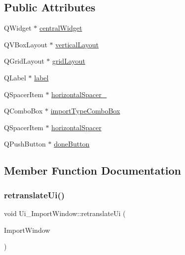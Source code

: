 \subsection*{Public Attributes}
\begin{DoxyCompactItemize}
\item 
Q\+Widget $\ast$ \hyperlink{class_ui___import_window_abb4ccd077c178442deb685480c58a116}{central\+Widget}
\item 
Q\+V\+Box\+Layout $\ast$ \hyperlink{class_ui___import_window_a829f7105bcbb2ebdfb559eca8e1f07bc}{vertical\+Layout}
\item 
Q\+Grid\+Layout $\ast$ \hyperlink{class_ui___import_window_a858c036d3eaf71ac64c67c59f114f6eb}{grid\+Layout}
\item 
Q\+Label $\ast$ \hyperlink{class_ui___import_window_a99c30b21060ced4fa3ab4966b826608a}{label}
\item 
Q\+Spacer\+Item $\ast$ \hyperlink{class_ui___import_window_a2e1e76d470d7b4a538df3738a0a935ab}{horizontal\+Spacer\+\_}
\item 
Q\+Combo\+Box $\ast$ \hyperlink{class_ui___import_window_a4574f5d09fee9653bb10cc8fba1edd5d}{import\+Type\+Combo\+Box}
\item 
Q\+Spacer\+Item $\ast$ \hyperlink{class_ui___import_window_abd4bfd12c654415c293e0ba0fe0474af}{horizontal\+Spacer}
\item 
Q\+Push\+Button $\ast$ \hyperlink{class_ui___import_window_af6115b60c28b5a54ebc7b15d0a9957cc}{done\+Button}
\end{DoxyCompactItemize}


\subsection{Member Function Documentation}
\mbox{\label{class_ui___import_window_ac7cf23e20c202e72ed26fbb2e6b719ad}} 
\subsubsection{\texorpdfstring{retranslate\+Ui()}{retranslateUi()}}
{\footnotesize\ttfamily void Ui\+\_\+\+Import\+Window\+::retranslate\+Ui (\begin{DoxyParamCaption}\item[{Q\+Main\+Window $\ast$}]{Import\+Window }\end{DoxyParamCaption})\hspace{0.3cm}{\ttfamily [inline]}}

